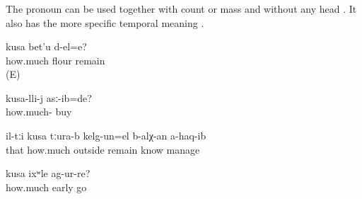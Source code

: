 
\subsubsection{ }
\label{sssec:kusa how much how many}

The pronoun  can be used together with count  or mass   and without any head  . It also has the more specific temporal meaning  .

\begin{exe}

	\ex	\label{ex:How much flour remained?}
	\gll	kusa	bet'u	d-el=e?\\
		how.much	flour	remain\\
	\glt	{} (E)

	\ex	\label{ex:For how much did you buy it}
	\gll	kusa-lli-j	asː-ib=de?\\
		how.much-	buy\\
	\glt	{}
	
	\ex	\label{ex:No one is able to know for how long they were away}
	\gll	il-tːi	kusa	tːura-b	kelg-un=el	b-alχ-an	a-haq-ib\\
		that	how.much	outside	remain	know	manage\\
	\glt	{}

	\ex	\label{ex:How (much) early did he go}
	\gll	kusa	ixʷle	ag-ur-re?\\
		how.much	early	go\\
	\glt	{}
\end{exe}



